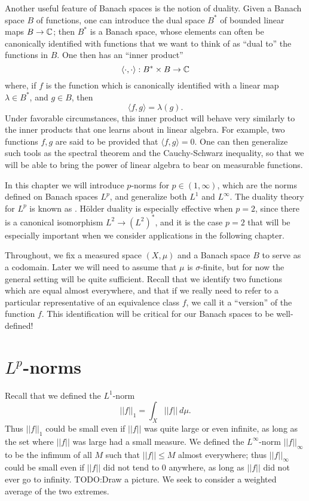 Another useful feature of Banach spaces is the notion of duality.
Given a Banach space $B$ of functions, one can introduce the dual space $B^{*}$ of bounded linear maps $B \to \mathbb{C}$; then $B^{*}$ is a Banach space, whose elements can often be canonically identified with functions that we want to think of as ``dual to'' the functions in $B$.
One then has an ``inner product''
\[\langle \cdot, \cdot\rangle: B^{*} \times B \to \mathbb{C}\]
where, if $f$ is the function which is canonically identified with a linear map $\lambda \in B^{*}$, and $g \in B$, then
\[\langle f, g\rangle = \lambda(g).\]
Under favorable circumstances, this inner product will behave very similarly to the inner products that one learns about in linear algebra.
For example, two functions $f, g$ are said to be  provided that $\langle f, g\rangle = 0$.
One can then generalize such tools as the spectral theorem and the Cauchy-Schwarz inequality, so that we will be able to bring the power of linear algebra to bear on measurable functions.

In this chapter we will introduce $p$-norms for $p \in (1, \infty)$, which are the norms defined on Banach spaces $L^{p}$, and generalize both $L^{1}$ and $L^{\infty}$.
The duality theory for $L^{p}$ is known as .
H\"older duality is especially effective when $p = 2$, since there is a canonical isomorphism $L^{2} \to {(L^{2})}^{*}$, and it is the case $p = 2$ that will be especially important when we consider applications in the following chapter.

Throughout, we fix a measured space $(X, \mu)$ and a Banach space $B$ to serve as a codomain.
Later we will need to assume that $\mu$ is $\sigma$-finite, but for now the general setting will be quite sufficient.
Recall that we identify two functions which are equal almost everywhere, and that if we really need to refer to a particular representative of an equivalence class $f$, we call it a ``version'' of the function $f$.
This identification will be critical for our Banach spaces to be well-defined!

\section{$L^{p}$-norms}
Recall that we defined the $L^{1}$-norm
\[||f||_{1} = \int_{X} ||f||~d\mu.\]
Thus $||f||_{1}$ could be small even if $||f||$ was quite large or even infinite, as long as the set where $||f||$ was large had a small measure.
We defined the $L^{\infty}$-norm $||f||_{\infty}$ to be the infimum of all $M$ such that $||f|| \leq M$ almost everywhere; thus $||f||_{\infty}$ could be small even if $||f||$ did not tend to $0$ anywhere, as long as $||f||$ did not ever go to infinity.
TODO:\@ Draw a picture.
We seek to consider a weighted average of the two extremes.

